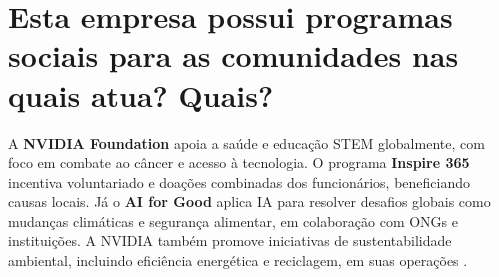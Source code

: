 \section{Esta empresa possui programas sociais para as comunidades nas quais atua? Quais?}

A \textbf{NVIDIA Foundation} apoia a saúde e educação STEM globalmente, com foco em combate ao câncer e acesso à tecnologia. O programa \textbf{Inspire 365} incentiva voluntariado e doações combinadas dos funcionários, beneficiando causas locais. Já o \textbf{AI for Good} aplica IA para resolver desafios globais como mudanças climáticas e segurança alimentar, em colaboração com ONGs e instituições. A NVIDIA também promove iniciativas de sustentabilidade ambiental, incluindo eficiência energética e reciclagem, em suas operações \cite{nvidia_foundation_impact}.
